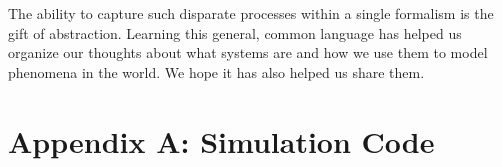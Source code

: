 \documentclass[12pt]{article}
\begin{document}
The ability to capture such disparate processes within a single formalism is the gift of abstraction.
Learning this general, common language has helped us organize our thoughts about what systems are and how we use them to model phenomena in the world.
We hope it has also helped us share them.




\nocite{*}

\pagebreak



\pagebreak
\section*{Appendix A: Simulation Code}
\end{document}
